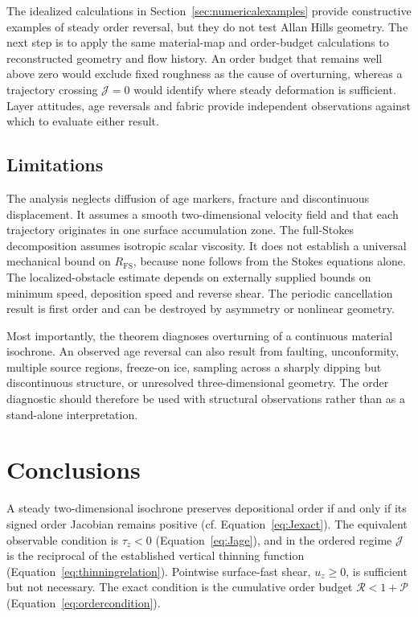 \documentclass[review]{igs}
\theoremstyle{definition}
\theoremstyle{remark}
\newcommand{\Rpos}{\mathcal{P}}
\newcommand{\Rneg}{\mathcal{R}}
\newcommand{\Jord}{\mathcal{J}}
\begin{document}
The idealized calculations in Section~\ref{sec:numericalexamples} provide constructive examples of steady order reversal, but they do not test Allan Hills geometry. The next step is to apply the same material-map and order-budget calculations to reconstructed geometry and flow history. An order budget that remains well above zero would exclude fixed roughness as the cause of overturning, whereas a trajectory crossing \(\Jord=0\) would identify where steady deformation is sufficient. Layer attitudes, age reversals and fabric provide independent observations against which to evaluate either result.

\subsection{Limitations}

The analysis neglects diffusion of age markers, fracture and discontinuous displacement. It assumes a smooth two-dimensional velocity field and that each trajectory originates in one surface accumulation zone. The full-Stokes decomposition assumes isotropic scalar viscosity. It does not establish a universal mechanical bound on \(R_{\mathrm{FS}}\), because none follows from the Stokes equations alone. The localized-obstacle estimate depends on externally supplied bounds on minimum speed, deposition speed and reverse shear. The periodic cancellation result is first order and can be destroyed by asymmetry or nonlinear geometry.

Most importantly, the theorem diagnoses overturning of a continuous material isochrone. An observed age reversal can also result from faulting, unconformity, multiple source regions, freeze-on ice, sampling across a sharply dipping but discontinuous structure, or unresolved three-dimensional geometry. The order diagnostic should therefore be used with structural observations rather than as a stand-alone interpretation.

\section{Conclusions}

A steady two-dimensional isochrone preserves depositional order if and only if its signed order Jacobian remains positive (cf. Equation~\eqref{eq:Jexact}). The equivalent observable condition is \(\tau_z<0\) (Equation~\eqref{eq:Jage}), and in the ordered regime \(\Jord\) is the reciprocal of the established vertical thinning function (Equation~\eqref{eq:thinningrelation}). Pointwise surface-fast shear, \(u_z\geq0\), is sufficient but not necessary. The exact condition is the cumulative order budget \(\Rneg<1+\Rpos\) (Equation~\eqref{eq:ordercondition}).
\end{document}
